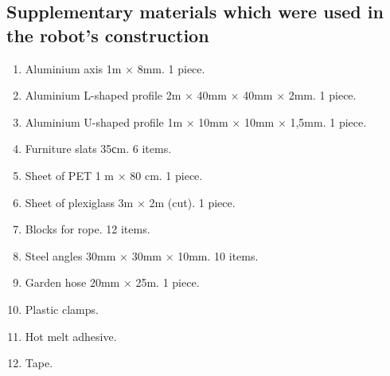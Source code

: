 
\subsection{Supplementary materials which were used in the robot's construction}

\begin{enumerate}
	\item Aluminium axis 1m $\times$ 8mm. 1 piece.
	\item Aluminium L-shaped profile 2m $\times$ 40mm $\times$ 40mm $\times$ 2mm. 1 piece.
	\item Aluminium U-shaped profile 1m $\times$ 10mm $\times$ 10mm $\times$ 1,5mm. 1 piece.
	\item Furniture slats 35сm. 6 items.
	\item Sheet of PET 1 m $\times$ 80 cm. 1 piece.
	\item Sheet of plexiglass 3m $\times$ 2m (cut). 1 piece.
	\item Blocks for rope. 12 items.
	\item Steel angles 30mm $\times$ 30mm $\times$ 10mm. 10 items.
	\item Garden hose 20mm $\times$ 25m. 1 piece.
	
	\item Plastic clamps.
	\item Hot melt adhesive.
	\item Tape.
\end{enumerate}
\fillpage
\newpage


